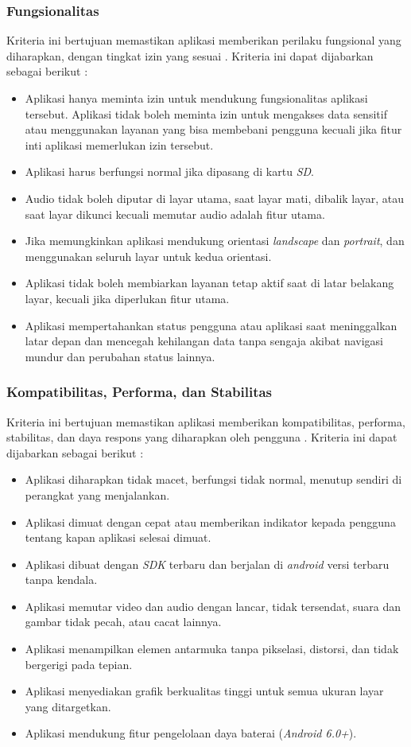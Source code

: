 \subsubsection{Fungsionalitas}
Kriteria ini bertujuan memastikan aplikasi memberikan perilaku fungsional yang diharapkan, dengan tingkat izin yang sesuai \cite{androiddev}. Kriteria ini dapat dijabarkan sebagai berikut : 
\begin{itemize}
    \item Aplikasi hanya meminta izin untuk mendukung fungsionalitas aplikasi tersebut. Aplikasi tidak boleh meminta izin untuk mengakses data sensitif atau menggunakan layanan yang bisa membebani pengguna kecuali jika fitur inti aplikasi memerlukan izin tersebut.
    \item Aplikasi harus berfungsi normal jika dipasang di kartu \textit{SD}.
    \item Audio tidak boleh diputar di layar utama, saat layar mati, dibalik layar, atau saat layar dikunci kecuali memutar audio adalah fitur utama.
    \item Jika memungkinkan aplikasi mendukung orientasi \textit{landscape} dan \textit{portrait}, dan menggunakan seluruh layar untuk kedua orientasi.
    \item Aplikasi tidak boleh membiarkan layanan tetap aktif saat di latar belakang layar, kecuali jika diperlukan fitur utama.
    \item Aplikasi mempertahankan status pengguna atau aplikasi saat meninggalkan latar depan dan mencegah kehilangan data tanpa sengaja akibat navigasi mundur dan perubahan status lainnya. 
\end{itemize}

\subsubsection{Kompatibilitas, Performa, dan Stabilitas}
Kriteria ini bertujuan memastikan aplikasi memberikan kompatibilitas, performa, stabilitas, dan daya respons yang diharapkan oleh pengguna \cite{androiddev}. Kriteria ini dapat dijabarkan sebagai berikut : 
\begin{itemize}
    \item Aplikasi diharapkan tidak macet, berfungsi tidak normal, menutup sendiri di perangkat yang menjalankan.
    \item Aplikasi dimuat dengan cepat atau memberikan indikator kepada pengguna tentang kapan aplikasi selesai dimuat.
    \item Aplikasi dibuat dengan \textit{SDK} terbaru dan berjalan di \textit{android} versi terbaru tanpa kendala.
    \item Aplikasi memutar video dan audio dengan lancar, tidak tersendat, suara dan gambar tidak pecah, atau cacat lainnya.
    \item Aplikasi menampilkan elemen antarmuka tanpa pikselasi, distorsi, dan tidak bergerigi pada tepian.
    \item Aplikasi menyediakan grafik berkualitas tinggi untuk semua ukuran layar yang ditargetkan. 
    \item Aplikasi mendukung fitur pengelolaan daya baterai (\textit{Android 6.0+}).  
\end{itemize}   

